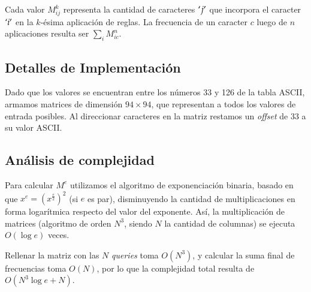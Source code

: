 Cada valor $M_{ij}^k$ representa la cantidad de caracteres $`j'$ que incorpora
el caracter $`i'$ en la $k$-ésima aplicación de reglas. La frecuencia
de un caracter $c$ luego de $n$ aplicaciones resulta ser $\sum_i M_{ic}^n$.


\subsection*{Detalles de Implementación}

Dado que los valores se encuentran entre los números 33 y 126 de la tabla ASCII,
armamos matrices de dimensión $94\times 94$, que representan a todos los valores
de entrada posibles. Al direccionar caracteres en la matriz restamos un {\sl offset}
de 33 a su valor ASCII.


\subsection*{Análisis de complejidad}

Para calcular $M^e$ utilizamos el algoritmo de exponenciación binaria, basado en
que $x^e = (x^\frac e 2)^2$ (si $e$ es par), disminuyendo la cantidad de
multiplicaciones en forma logarítmica respecto del valor del exponente. Así, la
multiplicación de matrices (algoritmo de orden $N^3$, siendo $N$
la cantidad de columnas) se ejecuta $O(\log e)$ veces.

Rellenar la matriz con las $N$ {\sl queries} toma $O(N^3)$, y calcular la suma
final de frecuencias toma $O(N)$, por lo que la complejidad total resulta de
$O(N^3\log e + N)$.
